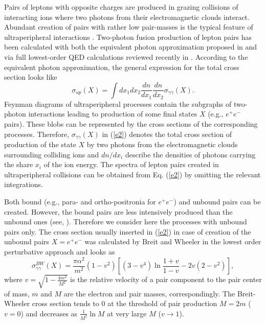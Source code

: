 \documentclass[12pt]{article}
\begin{document}
Pairs of leptons with opposite charges are produced in grazing collisions of 
interacting ions where two photons from their electromagnetic clouds interact. 
Abundant creation of pairs with rather low pair-masses is the typical feature 
of ultraperipheral interactions \cite{20dr}. Two-photon fusion production of 
lepton pairs has been calculated with both the equivalent photon approximation 
proposed in \cite{wei, wil} and via full lowest-order QED calculations
\cite{lali, rac, bgms, sergey1, sergey2} reviewed recently in \cite{drufn}.
According to the equivalent photon approximation, the general expression for
the total cross section looks like
\begin{equation}
\sigma _{up}(X)=
\int dx_1dx_2\frac {dn}{dx_1}\frac {dn}{dx_2}\sigma _{\gamma \gamma }(X).
\label{e2}
\end{equation}
Feynman diagrams of ultraperipheral processes contain the subgraphs of 
two-photon interactions leading to production of some final states $X$ 
(e.g., $e^+e^-$ pairs). These 
blobs can be represented by the cross sections of the corresponding processes.
Therefore, $\sigma _{\gamma \gamma }(X)$ in (\ref{e2}) denotes the total cross
section of production of the state $X$ by two photons from the electromagnetic
clouds surrounding colliding ions and $dn/dx_i$ describe the densities of
photons carrying the share $x_i$ of the ion energy. 
The spectra of lepton pairs created in ultraperipheral collisions can be 
obtained from Eq. (\ref{e2}) by omitting the relevant integrations.

Both bound (e.g., para- and ortho-positronia for $e^+e^-$) and unbound pairs 
can be created. However, the bound pairs are less intensively produced than 
the unbound ones (see, \cite{20dr}).
Therefore we consider here the processes with unbound pairs only.
The cross section usually inserted in (\ref{e2}) in case of creation of the 
unbound pairs $X=e^+e^-$ was calculated by Breit and Wheeler in the 
lowest order perturbative approach and looks \cite{blp,brwh} as
\begin{equation}
\sigma _{\gamma \gamma }^{BW}(X)=\frac {\pi \alpha ^2}{m^2}(1-v^2)
[(3-v^4)\ln \frac {1+v}{1-v}-2v(2-v^2)],
\label{mM}
\end{equation}
where $v=\sqrt {1-\frac {4m^2}{M^2}}$ is the relative velocity of a pair 
component to the pair center of mass, 
$m$ and $M$ are the electron and pair masses,
correspondingly. The Breit-Wheeler cross section tends to 0 at the threshold 
of pair production $M=2m$ ($v=0$) and decreases as $\frac {1}{M^2}\ln M$ at 
very large $M$ ($v\rightarrow 1$).
\end{document}
